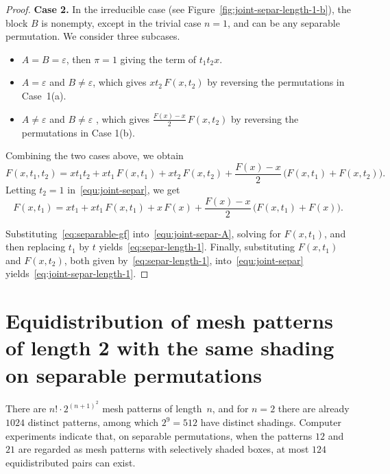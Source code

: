 \documentclass[12pt]{article}
\begin{document}
\begin{proof}
\noindent \textbf{Case 2.}  In the irreducible case (see Figure~\ref{fig:joint-separ-length-1-b}), the block $B$ is nonempty, except in the trivial case $n=1$, and can be any separable permutation. We consider three subcases.

\begin{itemize}
	\item[(a)] $A=B=\varepsilon$, then  $\pi=1$ giving the term of  $t_1t_2x$.

	\item[(b)] $A = \varepsilon$ and $B \neq \varepsilon$, which gives $xt_2\,F(x,t_2)$ by reversing the permutations in Case~1(a).	
	\item[(c)]$A \neq \varepsilon$ and $B \neq \varepsilon$ , which gives $\frac{F(x) - x}{2}\, F(x,t_2)$ by reversing the permutations in Case 1(b).
	
\end{itemize}
	Combining the two cases above, we obtain
\begin{equation}\label{equ:joint-separ}
	F(x,t_1,t_2) = x t_1 t_2 + x t_1\, F(x,t_1) + x t_2\, F(x,t_2) + \frac{F(x) - x}{2}\, \big(F(x,t_1) + F(x,t_2)\big).
\end{equation}
Letting $t_2=1$ in~\eqref{equ:joint-separ}, we get
\begin{equation}\label{equ:joint-separ-A}
	F(x,t_1) = x t_1 + x t_1\, F(x,t_1) + x \, F(x) + \frac{F(x) - x}{2}\, \big(F(x,t_1) + F(x)\big).
\end{equation}

Substituting~\eqref{eq:separable-gf} into~\eqref{equ:joint-separ-A}, solving for $F(x,t_1)$,
and then replacing $t_1$ by $t$ yields~\eqref{eq:separ-length-1}.
Finally, substituting $F(x,t_1)$ and $F(x,t_2)$, both given by~\eqref{eq:separ-length-1},
into~\eqref{equ:joint-separ} yields~\eqref{eq:joint-separ-length-1}.\end{proof}

\section{Equidistribution of mesh patterns of length 2 with the same shading on separable permutations} \label{section:3}

There are $n!\cdot 2^{(n+1)^2}$ mesh patterns of length~$n$, and for $n=2$ there are already $1024$ distinct patterns, among which $2^{9}=512$ have distinct shadings. Computer experiments indicate that, on separable permutations, when the patterns $12$ and $21$ are regarded as mesh patterns with selectively shaded boxes, at most $124$ equidistributed pairs can exist.
\end{document}
